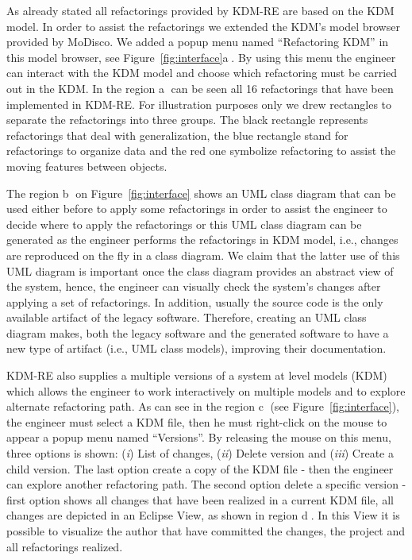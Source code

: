 As already stated all refactorings provided by KDM-RE are based on the KDM model. 
In order to assist the refactorings we extended the KDM's model browser provided by MoDisco. 
We added a popup menu named ``Refactoring KDM'' in this model browser, see Figure~\ref{fig:interface}\textcircled{a}.
By using this menu the engineer can interact with the KDM model and choose which refactoring must be carried out in the KDM.
In the region \textcircled{a} can be seen all 16 refactorings that have been implemented in KDM-RE. 
For illustration purposes only we drew rectangles to separate the refactorings into three groups. 
The black rectangle represents refactorings that deal with generalization, the blue rectangle stand for refactorings to organize data and the red one symbolize refactoring to assist the moving features between objects.

The region \textcircled{b} on Figure~\ref{fig:interface} shows an UML class diagram that can be used either before to apply some refactorings in order to assist the engineer to decide where to apply the refactorings or this UML class diagram can be generated as the engineer performs the refactorings in KDM model, i.e., changes are reproduced on the fly in a class diagram.
We claim that the latter use of this UML diagram is important once the class diagram provides an abstract view of the system, hence, the engineer can visually check the system's changes after applying a set of refactorings. 
In addition, usually the source code is the only available artifact of the legacy software. 
Therefore, creating an UML class diagram makes, both the legacy software and the generated software to have a new type of artifact (i.e., UML class models), improving their documentation.

KDM-RE also supplies a multiple versions of a system at level models (KDM) which allows the engineer to work interactively on multiple models and to explore alternate refactoring path. As can see in the region \textcircled{c} (see Figure~\ref{fig:interface}), the engineer must select a KDM file, then he must right-click on the mouse to appear a popup menu named ``Versions''. By releasing the mouse on this menu, three options is shown: (\textit{i}) List of changes, (\textit{ii}) Delete version and (\textit{iii}) Create a child version. The last option create a copy of the KDM file - then the engineer can explore another refactoring path. The second option delete a specific version - first option shows all changes that have been realized in a current KDM file, all changes are depicted in an Eclipse View, as shown in region \textcircled{d}. In this View it is possible to visualize the author that have committed the changes, the project and all refactorings realized.


